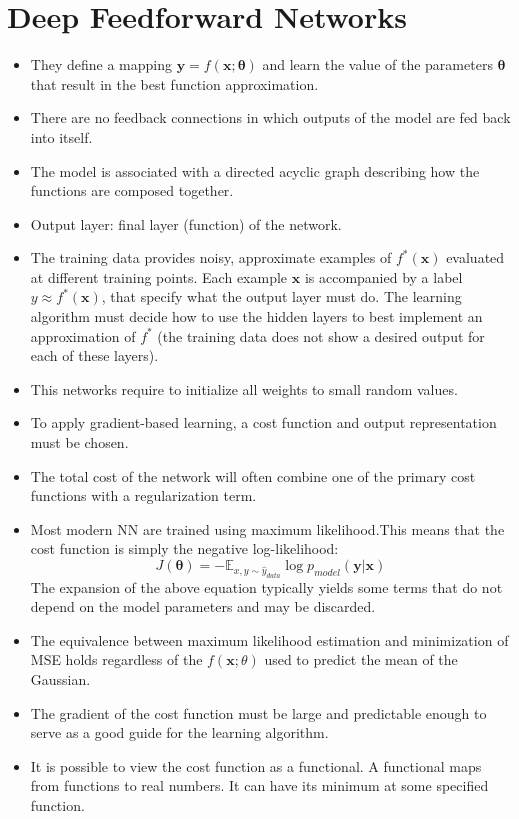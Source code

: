 \documentclass{article}
\begin{document}
\section{Deep Feedforward Networks}
\begin{itemize}
\item They define a mapping \(\boldsymbol{y} = f(\boldsymbol{x}; \boldsymbol{\theta})\) and learn the value of the parameters \(\boldsymbol{\theta}\) that result in the best function approximation.
\item There are no feedback connections in which outputs of the model are fed back into itself.
\item The model is associated with a directed acyclic graph describing how the functions are composed together.
\item Output layer: final layer (function) of the network.
\item The training data provides noisy, approximate examples of \(f^*(\boldsymbol{x})\) evaluated at different training points. Each example \(\boldsymbol{x}\) is accompanied by a label \(y \approx f^*(\boldsymbol{x})\), that specify what the output layer must do. The learning algorithm must decide how to use the hidden layers to best implement an approximation of \(f^*\) (the training data does not show a desired output for each of these layers).
\item This networks require to initialize all weights to small random values.
\item To apply gradient-based learning, a cost function and output representation must be chosen.
\item The total cost of the network will often combine one of the primary cost functions with a regularization term.
\item Most modern NN are trained using maximum likelihood.This means that the cost function is simply the negative log-likelihood:
\[
	J(\boldsymbol{\theta}) = -\mathbb{E}_{x,y \sim \hat{y}_{data}}\log{p}_{model}(\boldsymbol{y} | \boldsymbol{x})
\]
The expansion of the above equation typically yields some terms that do not depend on the model parameters and may be discarded.
\item The equivalence between maximum likelihood estimation and minimization of MSE holds regardless of the \(f(\boldsymbol{x}; \theta)\) used to predict the mean of the Gaussian.
\item The gradient of the cost function must be large and predictable enough to serve as a good guide for the learning algorithm.
\item It is possible to view the cost function as a functional. A functional maps from functions to real numbers. It can have its minimum at some specified function.

\end{itemize}
\end{document}
